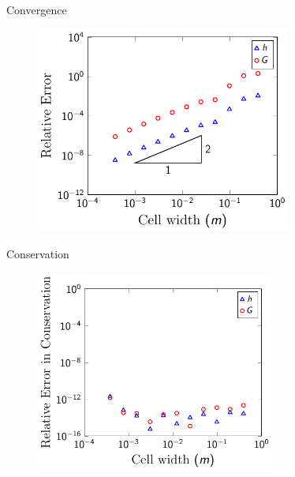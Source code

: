 \documentclass[pdf]{beamer}
\begin{document}
\begin{frame}{Convergence}
		\begin{figure}
			\includegraphics[width=0.75\textwidth]{./Pics/Tex/Soliton/L1/L1.pdf}
		\end{figure}
\end{frame}
\begin{frame}{Conservation}
			\begin{figure}
				\includegraphics[width=0.7\textwidth]{./Pics/Tex/Soliton/C1/C1.pdf}
			\end{figure}
\end{frame}
\end{document}
